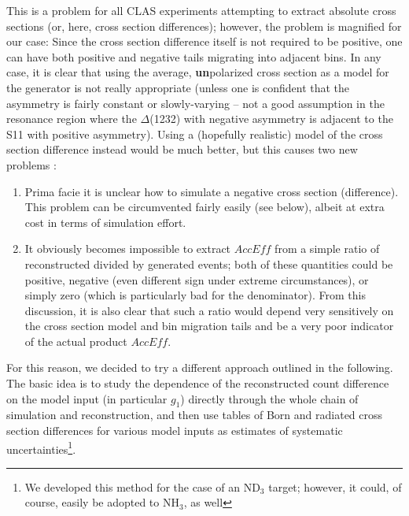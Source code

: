 This is a problem for all CLAS experiments attempting to extract absolute cross sections (or, here, cross section differences); however, the problem is magnified for our case: Since the cross section difference itself is not required to be positive, one can have both positive and negative tails migrating into adjacent bins. In any case, it is %
clear that using the average, {\bf un}polarized cross section as a model for the generator is not really appropriate (unless one is %
 confident that the asymmetry is fairly %
 constant or slowly-varying -- not a good assumption in the resonance region where the $\Delta$(1232) with negative asymmetry is adjacent to the S11 with positive asymmetry). Using a (hopefully realistic) model of the cross section difference instead would be much better, but %
 this causes two new problems \cite{KuhnEG4ana}:
\begin{enumerate}
\item Prima facie it is unclear how to simulate a negative cross section (difference). This problem can be circumvented fairly easily (see below), albeit at extra cost in terms of simulation effort.
\item It obviously becomes impossible to  extract $Acc Eff$ from a simple ratio of reconstructed divided by generated events; both of these quantities could be positive, negative (even different sign under extreme circumstances), or simply zero (which is particularly bad for the denominator). From this discussion, it is also clear that such a ratio would depend very sensitively on the cross section model and bin migration tails and be a very poor indicator of the actual product $Acc Eff$.
\end{enumerate}

For this reason, we decided to try a different approach outlined in the following. %
The basic idea is to study the dependence of the reconstructed count difference on the model input (in particular $g_1$) directly through the whole chain of simulation and reconstruction, and then use tables of Born and radiated cross section differences for various model inputs as estimates of systematic uncertainties\footnote{We developed this method for the case of an ND$_3$ target; however, it could, of course, easily be adopted to NH$_3$, as well}.



